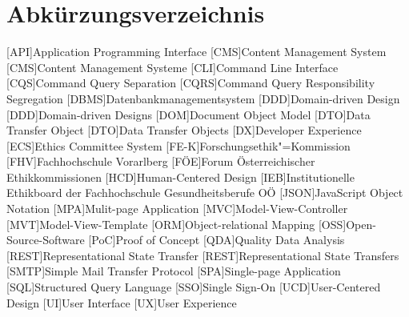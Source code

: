 \documentclass[a4paper,12pt,twoside]{scrreprt}
\begin{document}
\cleardoublepage
{}
\tableofcontents

\clearpage
{}
{}
\listoffigures

\clearpage
{}
{}
\listoftables

\clearpage
{}
{}
\listoflistings

\clearpage
{}
{}
\chapter*{Abkürzungsverzeichnis}

\begin{acronym}
    [API]{Application Programming Interface}
    [CMS]{Content Management System}
    [CMS]{Content Management Systeme}
    [CLI]{Command Line Interface}
    [CQS]{Command Query Separation}
    [CQRS]{Command Query Responsibility Segregation}
    [DBMS]{Datenbankmanagementsystem}
    [DDD]{Domain-driven Design}
    [DDD]{Domain-driven Designs}
    [DOM]{Document Object Model}
    [DTO]{Data Transfer Object}
    [DTO]{Data Transfer Objects}
    [DX]{Developer Experience}
    [ECS]{Ethics Committee System}
    [FE-K]{Forschungsethik"=Kommission}
    [FHV]{Fachhochschule Vorarlberg}
    [FÖE]{Forum Österreichischer Ethikkommissionen}
    [HCD]{Human-Centered Design}
    [IEB]{Institutionelle Ethikboard der Fachhochschule Gesundheitsberufe OÖ}
    [JSON]{JavaScript Object Notation}
    [MPA]{Mulit-page Application}
    [MVC]{Model-View-Controller}
    [MVT]{Model-View-Template}
    [ORM]{Object-relational Mapping}
    [OSS]{Open-Source-Software}
    [PoC]{Proof of Concept}
    [QDA]{Quality Data Analysis}
    [REST]{Representational State Transfer}
    [REST]{Representational State Transfers}
    [SMTP]{Simple Mail Transfer Protocol}
    [SPA]{Single-page Application}
    [SQL]{Structured Query Language}
    [SSO]{Single Sign-On}
    [UCD]{User-Centered Design}
    [UI]{User Interface}
    [UX]{User Experience}
\end{acronym}
\end{document}
